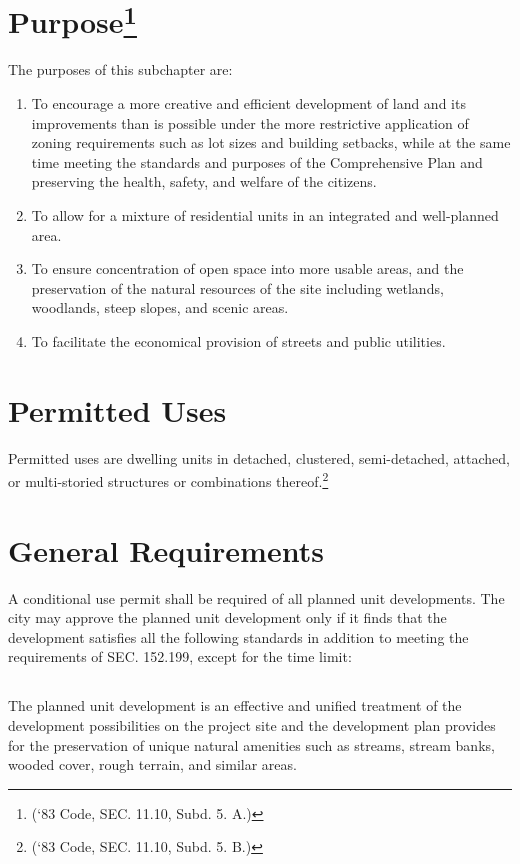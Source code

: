 \section{Purpose\footnote{(‘83 Code, SEC. 11.10, Subd. 5. A.)}}
The purposes of this subchapter are:
\begin{enumerate}[{\indent}A)]
    \item To encourage a more creative and efficient development of land and its improvements than is possible under the more restrictive application of zoning requirements such as lot sizes and building setbacks, while at the same time meeting the standards and purposes of the Comprehensive Plan and preserving the health, safety, and welfare of the citizens.
    \item To allow for a mixture of residential units in an integrated and well-planned area.
    \item To ensure concentration of open space into more usable areas, and the preservation of the natural resources of the site including wetlands, woodlands, steep slopes, and scenic areas.
    \item To facilitate the economical provision of streets and public utilities.
\end{enumerate}

\section{Permitted Uses}
Permitted uses are dwelling units in detached, clustered, semi-detached, attached, or multi-storied structures or combinations thereof.\footnote{(‘83 Code, SEC. 11.10, Subd. 5. B.)}

\section{General Requirements}
A conditional use permit shall be required of all planned unit developments. The city may approve the planned unit development only if it finds that the development satisfies all the following standards in addition to meeting the requirements of SEC. 152.199, except for the time limit:
\subsection{}
The planned unit development is an effective and unified treatment of the development possibilities on the project site and the development plan provides for the preservation of unique natural amenities such as streams, stream banks, wooded cover, rough terrain, and similar areas.
